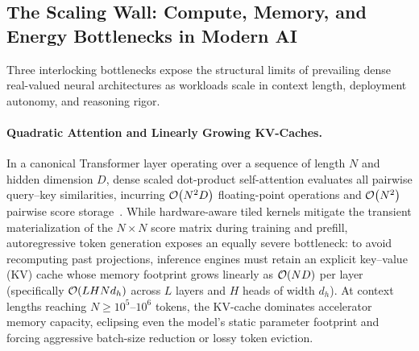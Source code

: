 \subsection{The Scaling Wall: Compute, Memory, and Energy Bottlenecks in Modern AI}\label{sec:intro:bottlenecks}

Three interlocking bottlenecks expose the structural limits of prevailing dense real-valued neural architectures as workloads scale in context length, deployment autonomy, and reasoning rigor.

\paragraph{Quadratic Attention and Linearly Growing KV-Caches.}
In a canonical Transformer layer operating over a sequence of length $N$ and hidden dimension $D$, dense scaled dot-product self-attention evaluates all pairwise query--key similarities, incurring $\mathcal{O}\!\left(N^2 D\right)$ floating-point operations and $\mathcal{O}\!\left(N^2\right)$ pairwise score storage~\cite{VASWANI_TRANSFORMER}.
While hardware-aware tiled kernels mitigate the transient materialization of the $N \times N$ score matrix during training and prefill, autoregressive token generation exposes an equally severe bottleneck: to avoid recomputing past projections, inference engines must retain an explicit key--value (KV) cache whose memory footprint grows linearly as $\mathcal{O}\!\left(ND\right)$ per layer (specifically $\mathcal{O}\!\left(L H N d_h\right)$ across $L$ layers and $H$ heads of width $d_h$).
At context lengths reaching $N \ge 10^5\text{--}10^6$ tokens, the KV-cache dominates accelerator memory capacity, eclipsing even the model's static parameter footprint and forcing aggressive batch-size reduction or lossy token eviction.

